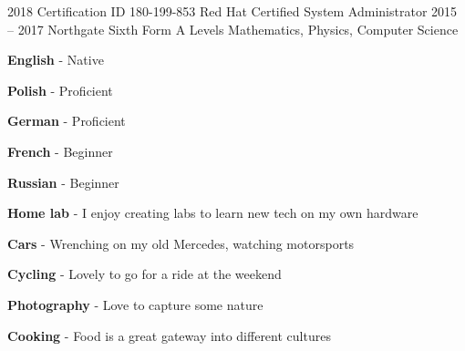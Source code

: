\documentclass[9pt]{developercv}
\begin{document}

    \begin{entrylist}
      \entry
        {2018}
        {Certification ID 180-199-853}
        {Red Hat Certified System Administrator}
        {}
      \entry
        {2015 -- 2017}
        {Northgate Sixth Form}
        {A Levels}
        {Mathematics, Physics, Computer Science}
    \end{entrylist}



    \begin{minipage}[t]{0.33\textwidth}


      \textbf{English} - Native

      \textbf{Polish} - Proficient

      \textbf{German} - Proficient

      \textbf{French} - Beginner

      \textbf{Russian} - Beginner
    \end{minipage}
    \begin{minipage}[t]{0.7\textwidth}


      \textbf{Home lab} - I enjoy creating labs to learn new tech on my own hardware

      \textbf{Cars} - Wrenching on my old Mercedes, watching motorsports

      \textbf{Cycling} - Lovely to go for a ride at the weekend

      \textbf{Photography} - Love to capture some nature

      \textbf{Cooking} - Food is a great gateway into different cultures
    \end{minipage}
\end{document}
